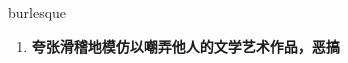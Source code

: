 
\begin{frame}
{\huge burlesque}
\begin{center}
\begin{enumerate}\Large
  \item \textbf{夸张滑稽地模仿以嘲弄他人的文学艺术作品，恶搞}
\end{enumerate}
\end{center}
\end{frame}
